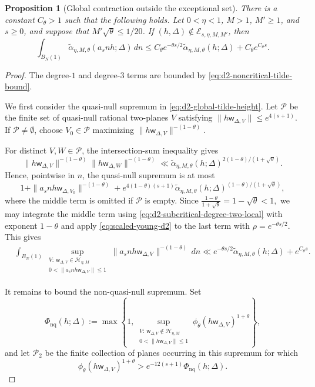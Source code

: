 \documentclass[reqno,11pt]{amsart}
\newtheorem{prop}[prop]{Proposition}
\theoremstyle{definition}
\theoremstyle{remark}
\numberwithin{equation}{section}
\begin{document}
\begin{prop}[Global contraction outside the exceptional set]
\label{prop:globalcontraction}
There is a constant $C_\theta>1$ such that the following holds. Let
$0<\eta<1$, $M>1$, $M'\ge1$, and $s\ge0$, and suppose that
$M'\sqrt\theta\le1/20$. If
$(h,\Delta)\notin\mathcal E_{s,\eta,M,M'}$, then
\begin{equation}\label{eq:d2-globalcontraction}
\int_{B_N(1)}
\widetilde\alpha_{\eta,M,\theta}(a_snh;\Delta)\,dn
\le
C_\theta e^{-\theta s/2}
\widetilde\alpha_{\eta,M,\theta}(h;\Delta)
+
C_\theta e^{C_\theta s}.
\end{equation}
\end{prop}
\begin{proof}
The degree-$1$ and degree-$3$ terms are bounded by
\eqref{eq:d2-noncritical-tilde-bound}.

We first consider the quasi-null supremum in
\eqref{eq:d2-global-tilde-height}. Let $\mathcal P$ be the finite set of
quasi-null rational two-planes $V$ satisfying
$\|h\mathsf w_{\Delta,V}\|\le e^{4(s+1)}$. If
$\mathcal P\ne\emptyset$, choose $V_0\in\mathcal P$ maximizing
$\|h\mathsf w_{\Delta,V}\|^{-(1-\theta)}$.

For distinct $V,W\in\mathcal P$, the intersection-sum inequality gives
$$
\|h\mathsf w_{\Delta,V}\|^{-(1-\theta)}
\|h\mathsf w_{\Delta,W}\|^{-(1-\theta)}
\ll
\widetilde\alpha_{\eta,M,\theta}(h;\Delta)^{
2(1-\theta)/(1+\sqrt\theta)}.
$$
Hence, pointwise in $n$, the quasi-null supremum is at most
$$
1+
\|a_snh\mathsf w_{\Delta,V_0}\|^{-(1-\theta)}
+
e^{4(1-\theta)(s+1)}
\widetilde\alpha_{\eta,M,\theta}(h;\Delta)^{
(1-\theta)/(1+\sqrt\theta)},
$$
where the middle term is omitted if $\mathcal P$ is empty. Since
$
\frac{1-\theta}{1+\sqrt\theta}=1-\sqrt\theta<1,
$
we may integrate the middle term using
\eqref{eq:d2-subcritical-degree-two-local} with exponent $1-\theta$ and
apply \eqref{eq:scaled-young-d2} to the last term with
$\rho=e^{-\theta s/2}$. This gives
\begin{equation}\label{eq:quasinull-global-bound}
\begin{aligned}
&\int_{B_N(1)}
\sup_{\substack{V:\ \mathsf w_{\Delta,V}\in\mathcal H_{\eta,M}\\
0<\|a_snh\mathsf w_{\Delta,V}\|\le1}}
\|a_snh\mathsf w_{\Delta,V}\|^{-(1-\theta)}\,dn \ll
e^{-\theta s/2}
\widetilde\alpha_{\eta,M,\theta}(h;\Delta)+e^{C_\theta s}.
\end{aligned}
\end{equation}

It remains to bound the non-quasi-null supremum. Set
$$
\Phi_{\mathrm{nq}}(h;\Delta)
:=
\max\left\{
1,
\sup_{\substack{V:\ \mathsf w_{\Delta,V}\notin\mathcal H_{\eta,M}\\
0<\|h\mathsf w_{\Delta,V}\|\le1}}
\phi_\theta(h\mathsf w_{\Delta,V})^{1+\theta}
\right\},
$$
and let $\mathcal P_2$ be the finite collection of planes occurring in
this supremum for which
$$
\phi_\theta(h\mathsf w_{\Delta,V})^{1+\theta}
>
e^{-12(s+1)}\Phi_{\mathrm{nq}}(h;\Delta).
$$


\end{proof}
\end{document}
